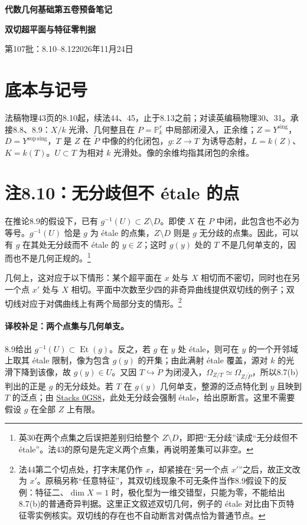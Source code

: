 \documentclass[openany,fontset=fandol]{ctexbook}
\newcommand{\PD}{\check P}
\newcommand{\Ys}{Y^{\mathrm{sing}}}
\newcommand{\Ds}{Y^{\mathrm{sup\,sing}}}
\begin{document}
\begin{center}
{\Large\bfseries 代数几何基础第五卷预备笔记}\par\medskip
{\LARGE\bfseries 双切超平面与特征零判据}\par\medskip
第107批：8.10--8.12\quad 2026年11月24日
\end{center}

\section*{底本与记号}
法稿物理43页的8.10起，续法44、45，止于8.13之前；对读英编稿物理30、31。承接8.8、8.9：$X/k$ 光滑、几何整且在 $P=\mathbb P^r_k$ 中局部闭浸入，正余维；$Z=\Ys$，$D=\Ds$，$T$ 是 $Z$ 在 $\PD$ 中像的约化闭包，$g:Z\to T$ 为诱导态射，$L=k(Z)$、$K=k(T)$。$U\subset T$ 为相对 $k$ 光滑处。像的余维均指其闭包的余维。

\section*{注8.10：无分歧但不 étale 的点}
在推论8.9的假设下，已有 $g^{-1}(U)\subset Z\setminus D$。即使 $X$ 在 $P$ 中闭，此包含也不必为等号。$g^{-1}(U)$ 恰是 $g$ 为 étale 的点集，$Z\setminus D$ 则是 $g$ 无分歧的点集。因此，可以有 $g$ 在其处无分歧而不 étale 的 $y\in Z$；这时 $g(y)$ 处的 $T$ 不是几何单支的，因而也不是几何正规的。\footnote{英30在两个点集之后误把差别归给整个 $Z\setminus D$，即把“无分歧”读成“无分歧但不 étale”。法43的原句是先定义两个点集，再说明差集可以非空。}

几何上，这对应于以下情形：某个超平面在 $x$ 处与 $X$ 相切而不密切，同时也在另一个点 $x'$ 处与 $X$ 相切。平面中次数至少四的非奇异曲线提供双切线的例子；双切线对应于对偶曲线上有两个局部分支的情形。\footnote{法44第二个切点处，打字末尾仍作 $x$，却紧接在“另一个点 $x'$”之后，故正文改为 $x'$。原稿另称“任意特征”，其双切线现象不可无条件当作8.9假设下的反例：特征二、$\dim X=1$ 时，极化型为一维交错型，只能为零，不能给出8.7(b)的普通奇异判据。这里正文叙述双切几何，例子的 étale 对比由下页特征零实例核实。双切线的存在也不自动断言对偶点恰为普通节点。}

\paragraph{译校补足：两个点集与几何单支。}
8.9给出 $g^{-1}(U)\subset\operatorname{Et}(g)$。反之，若 $g$ 在 $y$ 处 étale，则可在 $y$ 的一个开邻域上取其 étale 限制，像为包含 $g(y)$ 的开集；由此满射 étale 覆盖，源对 $k$ 的光滑下降到该像，故 $g(y)\in U$。又因 $T\hookrightarrow\PD$ 为闭浸入，$\Omega_{Z/T}\simeq\Omega_{Z/\PD}$，所以8.7(b)判出的正是 $g$ 的无分歧处。若 $T$ 在 $g(y)$ 几何单支，整源的泛点特化到 $y$ 且映到 $T$ 的泛点；由 \href{https://stacks.math.columbia.edu/tag/0GS8}{Stacks 0GS8}，此处无分歧会强制 étale，给出原断言。这里不需要假设 $g$ 在全部 $Z$ 上有限。
\end{document}
